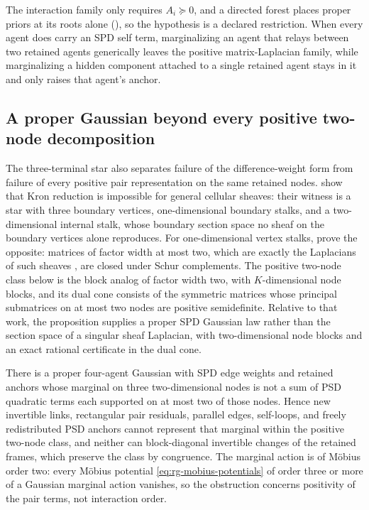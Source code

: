 The interaction family only requires \(A_i\succeq0\), and a directed forest
places proper priors at its roots alone (), so
the hypothesis is a declared restriction. When every agent does carry an SPD
self term, marginalizing an agent that relays between two retained agents
generically leaves the positive matrix-Laplacian family, while marginalizing a
hidden component attached to a single retained agent stays in it and only
raises that agent's anchor.

\subsection{A proper Gaussian beyond every positive two-node decomposition}
\label{sec:cg-kron-positive-pair-obstruction}

The three-terminal star also separates failure of the difference-weight form
from failure of every positive pair representation on the same retained nodes.
\citet[Sec.~4.2]{HansenGhrist2019} show that Kron reduction is impossible for
general cellular sheaves: their witness is a star with three boundary vertices,
one-dimensional boundary stalks, and a two-dimensional internal stalk, whose
boundary section space no sheaf on the boundary vertices alone reproduces. For
one-dimensional vertex stalks, \citet[Thm.~4.3]{HansenGhrist2019} prove the opposite: matrices
of factor width at most two, which are exactly the Laplacians of such sheaves
\citep[Sec.~3.2.2]{HansenGhrist2019}, are closed under Schur complements. The
positive two-node class below is the block analog of factor width two, with
\(K\)-dimensional node blocks, and its dual cone consists of the symmetric
matrices whose principal submatrices on at most two nodes are positive
semidefinite. Relative to that work, the proposition supplies a proper SPD
Gaussian law rather than the section space of a singular sheaf Laplacian, with
two-dimensional node blocks and an exact rational certificate in the dual cone.

There is a proper four-agent Gaussian with SPD edge weights and retained anchors
whose marginal on three two-dimensional nodes is not a sum of PSD quadratic
terms each supported on at most two of those nodes. Hence new invertible links,
rectangular pair residuals, parallel edges, self-loops, and freely
redistributed PSD anchors cannot represent that marginal within the positive
two-node class, and neither can block-diagonal invertible changes of the
retained frames, which preserve the class by congruence. The marginal action is
of M\"obius order two: every M\"obius potential
\eqref{eq:rg-mobius-potentials} of order three or more of a Gaussian marginal
action vanishes, so the obstruction concerns positivity of the pair terms, not
interaction order. 

